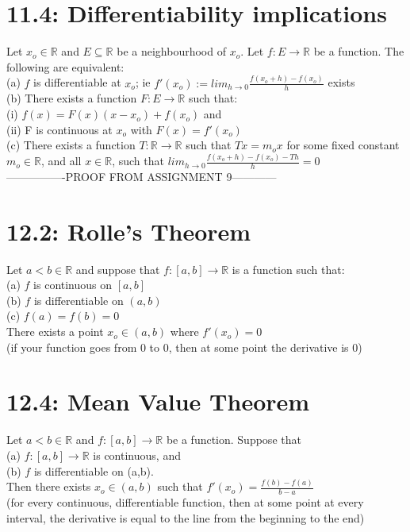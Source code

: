 \documentclass[10pt,letter]{report}
\begin{document}
\section*{11.4: Differentiability implications}
Let $x_o\in\mathbb{R}$ and $E\subseteq\mathbb{R}$ be a neighbourhood of $x_o$. Let $f:E\rightarrow\mathbb{R}$ be a function. The following are equivalent: \\ 
(a) $f$ is differentiable at $x_o$; ie $f'(x_o):=lim_{h\rightarrow0}\frac{f(x_o+h)-f(x_o)}{h}$ exists \\ 
(b) There exists a function $F:E\rightarrow\mathbb{R}$ such that: \\
\hspace*{5mm} (i) $f(x)=F(x)(x-x_o)+f(x_o)$ and \\
\hspace*{5mm} (ii) F is continuous at $x_o$ with $F(x)=f'(x_o)$ \\ 
(c) There exists a function $T:\mathbb{R}\rightarrow\mathbb{R}$ such that $Tx=m_ox$ for some fixed constant $m_o\in\mathbb{R}$, and all $x\in\mathbb{R}$, such that $lim_{h\rightarrow0}\frac{f(x_o+h)-f(x_o)-Th}{h} = 0$\\ 

----------------PROOF FROM ASSIGNMENT 9------------

\section*{12.2: Rolle's Theorem}
Let $a<b\in\mathbb{R}$ and suppose that $f:[a,b]\rightarrow\mathbb{R}$ is a function such that: \\ 
(a) $f$ is continuous on $[a,b]$ \\ 
(b) $f$ is differentiable on $(a,b)$\\ 
(c) $f(a) =f(b)=0$\\ 
There exists a point $x_o\in(a,b)$ where $f'(x_o)=0$ \\ 
(if your function goes from 0 to 0, then at some point the derivative is 0) 

\section*{12.4: Mean Value Theorem}
Let $a<b\in\mathbb{R}$ and $f:[a,b]\rightarrow\mathbb{R}$ be a function. Suppose that \\ 
(a) $f:[a,b]\rightarrow\mathbb{R}$ is continuous, and \\ 
(b) $f$ is differentiable on (a,b). \\ 
Then there exists $x_o\in(a,b)$ such that $f'(x_o)=\frac{f(b)-f(a)}{b-a}$\\ 
(for every continuous, differentiable function, then at some point at every interval, the derivative is equal to the line from the beginning to the end)
\end{document}

